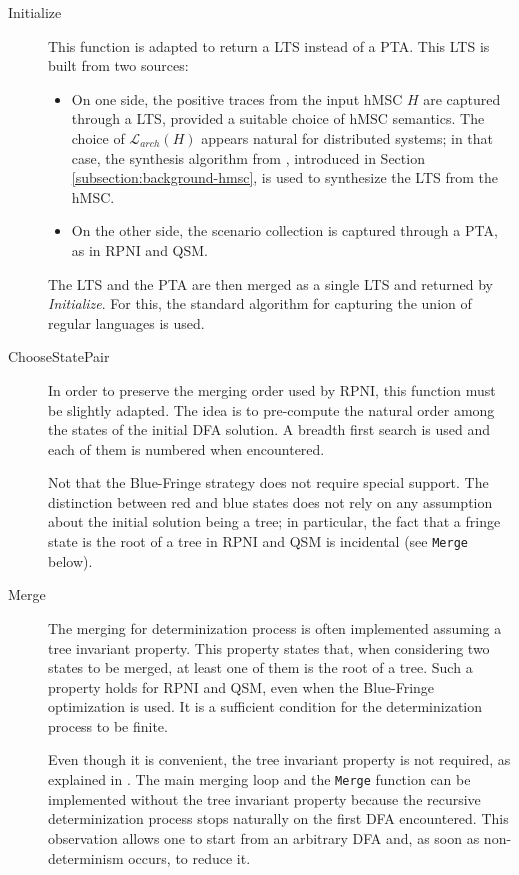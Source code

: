\begin{description}

\item[Initialize] This function is adapted to return a LTS instead of a PTA. This LTS is built from two sources:
\begin{itemize}
\item On one side, the positive traces from the input hMSC $H$ are captured through a LTS, provided a suitable choice of hMSC semantics. The choice of $\mathcal{L}_{arch}(H)$ appears natural for distributed systems; in that case, the synthesis algorithm from \cite{Uchitel:2003}, introduced in Section \ref{subsection:background-hmsc}, is used to synthesize the LTS from the hMSC.
\item On the other side, the scenario collection is captured through a PTA, as in RPNI and QSM.
\end{itemize}
The LTS and the PTA are then merged as a single LTS and returned by \emph{Initialize}. For this, the standard algorithm for capturing the union of regular languages \cite{Hopcroft:1979} is used.

\item[ChooseStatePair] In order to preserve the merging order used by RPNI, this function must be slightly adapted. The idea is to pre-compute the natural order among the states of the initial DFA solution. A breadth first search is used and each of them is numbered when encountered. 

Not that the Blue-Fringe strategy does not require special support. The distinction between red and blue states does not rely on any assumption about the initial solution being a tree; in particular, the fact that a fringe state is the root of a tree in RPNI and QSM is incidental (see \texttt{Merge} below).

\item[Merge] The merging for determinization process is often implemented assuming a tree invariant property. This property states that, when considering two states to be merged, at least one of them is the root of a tree. Such a property holds for RPNI and QSM, even when the Blue-Fringe optimization is used. It is a sufficient condition for the determinization process to be finite. 

Even though it is convenient, the tree invariant property is not required, as explained in \cite{Lambeau:2008}. The main merging loop and the \texttt{Merge} function can be implemented without the tree invariant property because the recursive determinization process stops naturally on the first DFA encountered. This observation allows one to start from an arbitrary DFA and, as soon as non-determinism occurs, to reduce it. 

\end{description}

